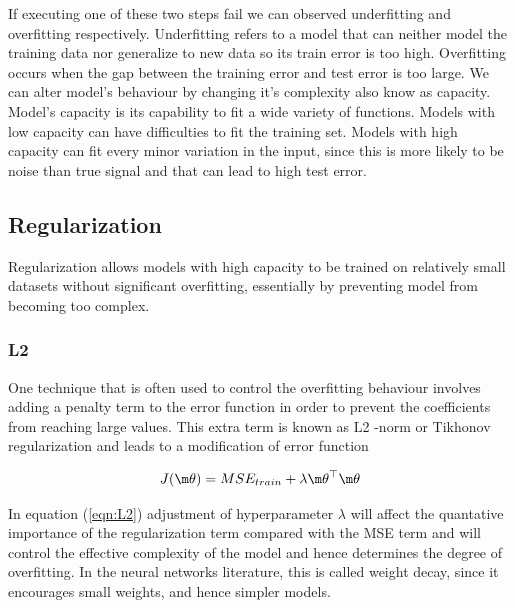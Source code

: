 \documentclass[12pt]{article}
\theoremstyle{definition}
\DeclareRobustCommand{\[}{\begin{equation}}
\DeclareRobustCommand{\]}{\end{equation}}
\begin{document}
        If executing one of these two steps fail we can observed underfitting and overfitting respectively. 
        Underfitting refers to a model that can neither model the training data nor generalize to new data so its train error is too high.
         Overﬁtting occurs when the gap between the training error and test error is too large. 
        We can alter model's behaviour by changing it's complexity also know as capacity.
        Model’s capacity is its capability to ﬁt a wide variety of functions. Models with low capacity can have difficulties to ﬁt the training set. Models with high capacity can fit every minor variation in the input, since this is more likely to be noise than true signal and that can lead to high test error. \cite{Goodfellow-et-al-2016} \cite{ProbabilisticApproach} \cite{PatternRecognition}

    \subsection{Regularization}
        Regularization allows models with high capacity to be trained on relatively small datasets 
        without significant overfitting, essentially by preventing model from becoming too complex.
        \subsubsection{L2}
            
            One technique that is often used to control the overfitting behaviour involves adding a penalty term to the error function in order to prevent the coefficients from reaching large values. This extra term is known as  L2 -norm or Tikhonov regularization and leads to a modification of error function
            
            \begin{equation}
                \begin{align}
                   J(\m\theta) = MSE_{train}+\lambda \displaystyle \m\theta^\top\displaystyle \m\theta
                \end{align}     
                \label{eqn:L2}
            \end{equation}
   
                In equation (\ref{eqn:L2}) adjustment of hyperparameter $\lambda$ will affect the 
            quantative importance of the regularization term compared with the MSE term and will control the effective complexity of the model and hence determines the degree of overfitting.
            In the neural networks literature, this is called weight decay, since it encourages small weights, and hence simpler models. \cite{WeightDecay} \cite{Goodfellow-et-al-2016}
        
\end{document}

